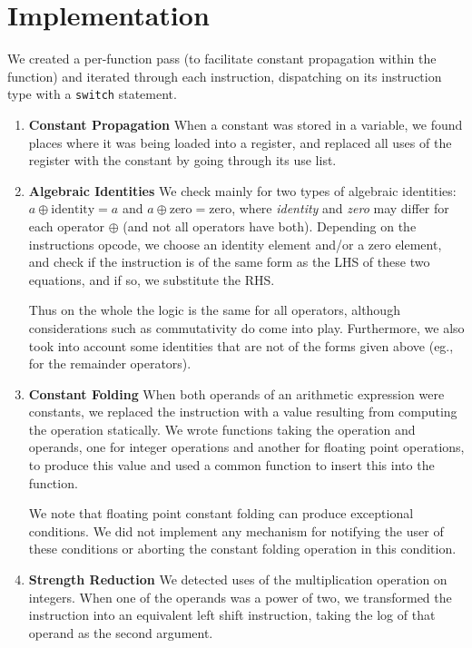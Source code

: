 \documentclass[12pt]{article}
\begin{document}
\section{Implementation}
We created a per-function pass (to facilitate constant propagation within the function) and iterated through each instruction, dispatching on its instruction type with a \texttt{switch} statement.
\begin{enumerate}
\item \textbf{Constant Propagation} When a constant was stored in a variable, we found places where it was being loaded into a register, and replaced all uses of the register with the constant by going through its use list. 
\item \textbf{Algebraic Identities} We check mainly for two types of algebraic identities: $a \oplus \text{identity} = a$ and $a \oplus \text{zero} = \text{zero}$, where \emph{identity} and \emph{zero} may differ for each operator $\oplus$ (and not all operators have both). Depending on the instructions opcode, we choose an identity element and/or a zero element, and check if the instruction is of the same form as the LHS of these two equations, and if so, we substitute the RHS. 

Thus on the whole the logic is the same for all operators, although considerations such as commutativity do come into play. Furthermore, we also took into account some identities that are not of the forms given above (eg., for the remainder operators).
\item \textbf{Constant Folding} When both operands of an arithmetic expression were constants, we replaced the instruction with a value resulting from computing the operation statically. We wrote  functions taking the operation and operands, one for integer operations and another for floating point operations, to produce this value and used a common function to insert this into the function.

We note that floating point constant folding can produce exceptional conditions. We did not implement any mechanism for notifying the user of these conditions or aborting the constant folding operation in this condition.
\item \textbf{Strength Reduction} We detected uses of the multiplication operation on integers. When one of the operands was a power of two, we transformed the instruction into an equivalent left shift instruction, taking the log of that operand as the second argument.
\end{enumerate}
\end{document}
